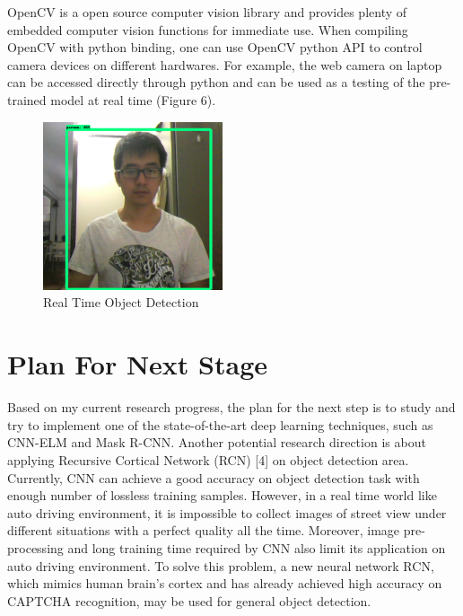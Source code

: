\documentclass[titlepage]{article}
\begin{document}
OpenCV is a open source computer vision library and provides plenty of
embedded computer vision functions for immediate use. When compiling OpenCV
with python binding, one can use OpenCV python API to control camera devices on
different hardwares. For example, the web camera on laptop can be accessed
directly through python and can be used as a testing of the pre-trained model at
real time (Figure 6).

\begin{figure}[htbp]
\centering
\includegraphics[width=200]{openCV.png}
\caption{Real Time Object Detection}
\end{figure}
\newpage

\section{Plan For Next Stage}
\label{sec:org46c1947}
Based on my current research progress, the plan for the next step is to study
and try to implement one of the state-of-the-art deep learning techniques,
such as CNN-ELM and Mask R-CNN. Another potential research direction is about
applying Recursive Cortical Network (RCN) [4] on object detection area.
Currently, CNN can achieve a good accuracy on object detection task with
enough number of lossless training samples. However, in a real time world like
auto driving environment, it is impossible to collect images of street view
under different situations with a perfect quality all the time. Moreover,
image pre-processing and long training time required by CNN also limit its
application on auto driving environment. To solve this problem, a new neural
network RCN, which mimics human brain's cortex and has already achieved high
accuracy on CAPTCHA recognition, may be used for general object detection.
\end{document}

